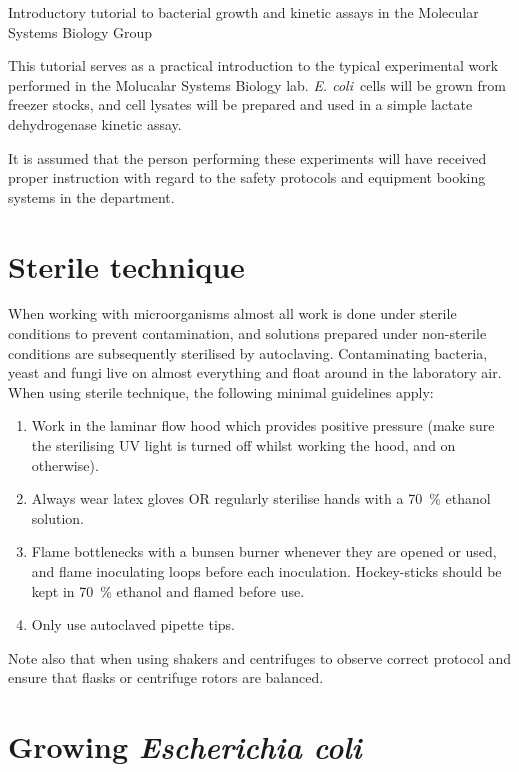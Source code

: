 \documentclass[a4paper]{article}
\newcommand{\ec}{\textit{E. coli}}
\begin{document}
 \begin{center} \huge Introductory tutorial to bacterial growth
and kinetic assays in the Molecular Systems Biology Group\\ \normalsize
\end{center} 

\begin{multicols}{2} This tutorial serves as a practical introduction to the
typical experimental work performed in the Molucalar Systems Biology lab. \ec\
cells will be grown from freezer stocks, and cell lysates will be prepared and
used in a simple lactate dehydrogenase kinetic assay.

It is assumed that the person performing these experiments will have received
proper instruction with regard to the safety protocols and equipment booking
systems in the department.

\section{Sterile technique} 

When working with microorganisms almost all work is done under sterile
conditions to prevent contamination, and solutions prepared under non-sterile
conditions are subsequently sterilised by autoclaving. Contaminating bacteria,
yeast and fungi live on almost everything and float around in the laboratory
air. When using sterile technique, the following minimal guidelines apply:

\begin{enumerate} 
\item Work in the laminar flow hood which provides positive
pressure (make sure the sterilising UV light is turned off whilst working the
hood, and on otherwise).  
\item Always wear latex gloves OR regularly sterilise
hands with a 70~\% ethanol solution.  
\item Flame bottlenecks with a bunsen
burner whenever they are opened or used, and flame inoculating loops before
each inoculation. Hockey-sticks should be kept in 70~\% ethanol and flamed
before use.  
\item Only use autoclaved pipette tips.  
\end{enumerate}

Note also that when using shakers and centrifuges to observe correct protocol
and ensure that flasks or centrifuge rotors are balanced.

\section{Growing \textit{Escherichia coli}} 


\end{multicols}
\end{document}
